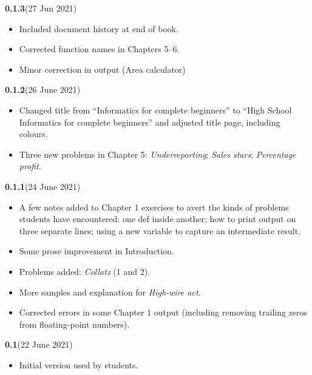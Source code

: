 

{
\small

\newcommand{\versionmarker}[2]{\textbf{#1}\quad(#2)}

\versionmarker{0.1.3}{27 Jun 2021}
\begin{itemize}
  \item Included document history at end of book.
  \item Corrected function names in Chapters 5--6.
  \item Minor correction in output (Area calculator)
\end{itemize}

\versionmarker{0.1.2}{26 June 2021}
\begin{itemize}
  \item Changed title from ``Informatics for complete beginners'' to ``High School
    Informatics for complete beginners'' and adjusted title page, including colours.
  \item Three new problems in Chapter 5: \emph{Underreporting}; \emph{Sales stars};
    \emph{Percentage profit}.
\end{itemize}

\versionmarker{0.1.1}{24 June 2021}
\begin{itemize}
  \item A few notes added to Chapter 1 exercises to avert the kinds of problems students
    have encountered: one def inside another; how to print output on three separate lines;
    using a new variable to capture an intermediate result.
  \item Some prose improvement in Introduction.
  \item Problems added: \emph{Collatz} (1 and 2).
  \item More samples and explanation for \emph{High-wire act}.
  \item Corrected errors in some Chapter 1 output (including removing trailing zeros from
    floating-point numbers).
\end{itemize}

\versionmarker{0.1}{22 June 2021}
\begin{itemize}
  \item Initial version used by students.
\end{itemize}

}

